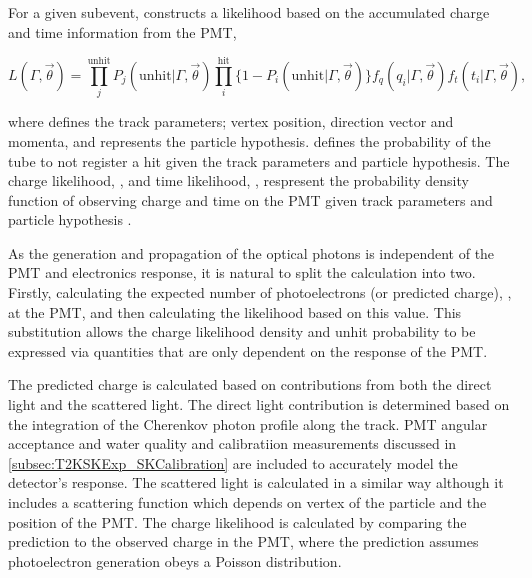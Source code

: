 For a given subevent, \fq constructs a likelihood based on the accumulated charge  and time information  from the  PMT,

\begin{equation}
  L(\Gamma, \vec{\theta}) = \prod^{\text{unhit}}_{j} P_{j}(\text{unhit}|\Gamma,\vec{\theta}) \prod^{\text{hit}}_{i} \{ 1 - P_{i}(\text{unhit}|\Gamma,\vec{\theta}) \}   f_{q}(q_{i} | \Gamma, \vec{\theta}) f_{t}(t_{i} | \Gamma, \vec{\theta}),
\end{equation}

where \quickmath{\vec{\theta}} defines the track parameters; vertex position, direction vector and momenta, and \quickmath{\Gamma} represents the particle hypothesis.  defines the probability of the  tube to not register a hit given the track parameters and particle hypothesis. The charge likelihood, , and time likelihood, , respresent the probability density function of observing charge  and time  on the  PMT given track parameters \quickmath{\vec{\theta}} and particle hypothesis \quickmath{\Gamma}.

As the generation and propagation of the optical photons is independent of the PMT and electronics response, it is natural to split the calculation into two. Firstly, calculating the expected number of photoelectrons (or predicted charge), , at the  PMT, and then calculating the likelihood based on this value. This substitution allows the charge likelihood density  and unhit probability  to be expressed via quantities that are only dependent on the response of the PMT. 

The predicted charge is calculated based on contributions from both the direct light and the scattered light. The direct light contribution is determined based on the integration of the Cherenkov photon profile along the track. PMT angular acceptance and water quality and calibratiion measurements discussed in \autoref{subsec:T2KSKExp_SKCalibration} are included to accurately model the detector's response. The scattered light is calculated in a similar way although it includes a scattering function which depends on vertex of the particle and the position of the PMT. The charge likelihood is calculated by comparing the prediction to the observed charge in the PMT, where the prediction assumes photoelectron generation obeys a Poisson distribution.

